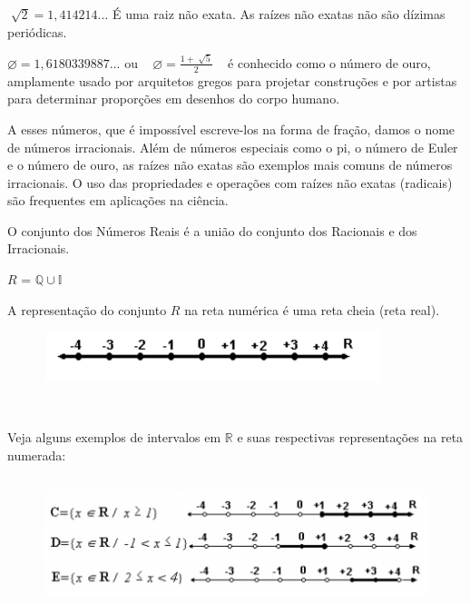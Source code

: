  \( \sqrt[]{2}=1,414214 \ldots  \)  É uma raiz não exata. As raízes não exatas não são dízimas periódicas.

$\varnothing =1,6180339887$... ou ~  \(  \varnothing =\frac{1+\sqrt[]{5}}{2} \) ~ é conhecido como o número de ouro, amplamente usado por arquitetos gregos para projetar construções e por artistas para determinar proporções em desenhos do corpo humano. 

A esses números, que é impossível escreve-los na forma de fração, damos o nome de números irracionais. Além de números especiais como o pi, o número de Euler e o número de ouro, as raízes não exatas são exemplos mais comuns de números irracionais. O uso das propriedades e operações com raízes não exatas (radicais) são frequentes em aplicações na ciência.
\begin{caixa}
	\begin{tdefinicao}
		
		O conjunto dos Números Reais é a união do conjunto dos Racionais e dos Irracionais.

		\quad  \( R \)  =  \( \mathbb{Q} \cup \mathbb{I}\) \qedsymbol{}
	\end{tdefinicao}
\end{caixa}
A representação do conjunto  \( R \)  na reta numérica é uma reta cheia (reta real).

\begin{figure}[H]
	\begin{Center}
		\includegraphics[width=3.9in,height=0.57in]{capitulos/conjuntos_numericos/media/image9.pdf}
	\end{Center}
\end{figure}

~~

Veja alguns exemplos de intervalos em  \( \mathbb{R} \) e suas respectivas representações na reta numerada:

\begin{figure}[H]
	\begin{Center}
		\includegraphics[width=5.72in,height=1.53in]{capitulos/conjuntos_numericos/media/image10.pdf}
	\end{Center}
\end{figure}

